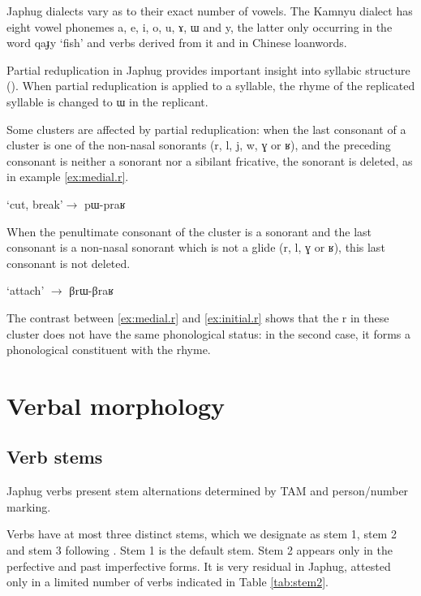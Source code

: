 \documentclass[oldfontcommands,oneside,a4paper,11pt]{article}
\newcommand{\ipa}[1]{{\phon #1}} %
\begin{document}
Japhug dialects vary as to their exact number of vowels. The Kamnyu dialect has eight vowel phonemes \ipa{a},  \ipa{e},  \ipa{i},  \ipa{o},  \ipa{u},   \ipa{ɤ},  \ipa{ɯ} and \ipa{y}, the latter only occurring in the word \ipa{qaɟy} `fish' and verbs derived from it and in Chinese loanwords. 

Partial reduplication in Japhug provides important insight into syllabic structure (\citealt{jacques07redupl}). When partial reduplication is applied to a syllable, the rhyme of the replicated syllable is changed to \ipa{ɯ} in the replicant.
 
Some clusters are affected by partial reduplication:   when the last consonant  of a cluster is one of the non-nasal sonorants (\ipa{r}, \ipa{l}, \ipa{j}, \ipa{w}, \ipa{ɣ} or \ipa{ʁ}), and the preceding consonant is neither a sonorant nor a sibilant fricative, the sonorant is deleted, as in example \ref{ex:medial.r}. 
 
 \begin{exe}
\ex \label{ex:medial.r}
\glt \ipa{praʁ} `cut, break'$\rightarrow$ \ipa{pɯ-praʁ}
\end{exe}

When the penultimate consonant of the cluster is a sonorant   and the last consonant is a non-nasal sonorant which is not a glide (\ipa{r}, \ipa{l}, \ipa{ɣ} or \ipa{ʁ}), this last consonant  is not deleted. 

 \begin{exe}
\ex  \label{ex:initial.r}
\glt \ipa{βraʁ} `attach' $\rightarrow$ \ipa{βrɯ-βraʁ}
\end{exe}
 
The contrast between \ref{ex:medial.r} and \ref{ex:initial.r} shows that the \ipa{r} in these cluster does not have the same phonological status: in the second case, it forms a phonological constituent with the rhyme.



\section{Verbal morphology}

\subsection{Verb stems}

Japhug verbs present stem alternations determined by TAM and person/number marking. 

Verbs have at most three distinct stems, which we designate as stem 1, stem 2 and stem 3 following \citet{jackson00sidaba}. Stem 1 is the default stem. Stem 2 appears only in the perfective and past imperfective forms. It is very residual in Japhug, attested only in a limited number of verbs indicated in Table \ref{tab:stem2}.
\end{document}

